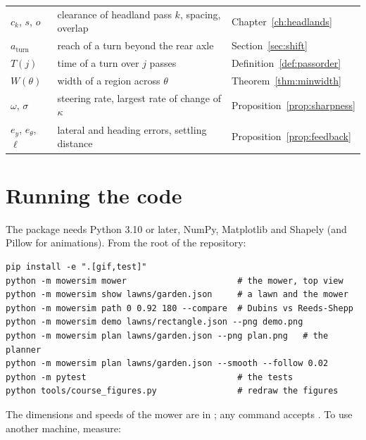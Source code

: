 \begin{center}
\begin{tabular}{@{}lll@{}}
  $c_k$, $s$, $o$ & clearance of headland pass $k$, spacing, overlap &
    Chapter~\ref{ch:headlands} \\
  $a_{\mathrm{turn}}$ & reach of a turn beyond the rear axle &
    Section~\ref{sec:shift} \\
  $T(j)$ & time of a turn over $j$ passes & Definition~\ref{def:passorder}
    \\
  $W(\theta)$ & width of a region across $\theta$ &
    Theorem~\ref{thm:minwidth} \\
  $\omega$, $\sigma$ & steering rate, largest rate of change of $\kappa$ &
    Proposition~\ref{prop:sharpness} \\
  $e_y$, $e_\theta$, $\ell$ & lateral and heading errors, settling distance
    & Proposition~\ref{prop:feedback} \\
  \bottomrule
\end{tabular}
\end{center}

\section{Running the code}

The package needs Python 3.10 or later, NumPy, Matplotlib and Shapely (and
Pillow for animations). From the root of the repository:

\begin{verbatim}
pip install -e ".[gif,test]"
python -m mowersim mower                      # the mower, top view
python -m mowersim show lawns/garden.json     # a lawn and the mower
python -m mowersim path 0 0.92 180 --compare  # Dubins vs Reeds-Shepp
python -m mowersim demo lawns/rectangle.json --png demo.png
python -m mowersim plan lawns/garden.json --png plan.png   # the planner
python -m mowersim plan lawns/garden.json --smooth --follow 0.02
python -m pytest                              # the tests
python tools/course_figures.py                # redraw the figures
\end{verbatim}

The dimensions and speeds of the mower are in ; any command
accepts . To use another machine, measure:


